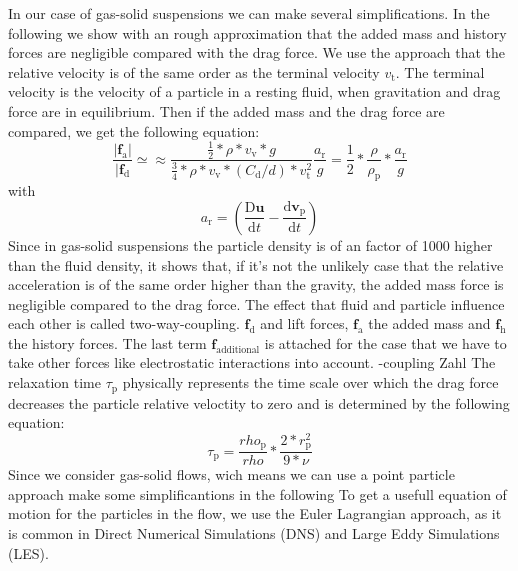 \documentclass[a4paper,12pt]{article}
\renewcommand*\vec[1]{\boldsymbol{#1}}
\numberwithin{equation}{section} %
\begin{document}
In our case of gas-solid suspensions we can make several simplifications.
In the following we show with an rough approximation that the added mass and history forces are negligible compared with the drag force.
We use the approach that the relative velocity is of the same order as the terminal velocity $v_\mathrm{t}$. The terminal velocity is the velocity of a particle in a resting fluid, when gravitation and drag force are in equilibrium. Then if the added mass and the drag force are compared, we get the following equation:
\begin{equation}
\frac{|\vec{f_\mathrm{a}}|}{|\vec{f_\mathrm{d}}} \simeq \approx \frac{\frac{1}{2}*\rho*v_\mathrm{v}*g}{\frac{3}{4}*\rho*v_\mathrm{v}*(C_\mathrm{d}/d)*v_\mathrm{t}^\mathrm{2}}\frac{a_\mathrm{r}}{g} = \frac{1}{2}*\frac{\rho}{\rho_\mathrm{p}}*\frac{a_\mathrm{r}}{g}
\end{equation}
with 
\begin{equation}
a_\mathrm{r}=(\frac{\mathrm{D}\vec{u}}{\mathrm{d}t}-\frac{\mathrm{d}\vec{v_\mathrm{p}}}{\mathrm{d}t})
\end{equation}
Since in gas-solid suspensions the particle density is of an factor of 1000 higher than the fluid density, it shows that, if it's not the unlikely case that the relative acceleration is of the same order higher than the gravity, the added mass force is negligible compared to the drag force.
The effect that fluid and particle influence each other is called two-way-coupling.
$\vec{f_\mathrm{d}}$ and lift forces, $\vec{f_\mathrm{a}}$  the added mass and $\vec{f_\mathrm{h}}$ the history forces. The last term $\vec{f_\mathrm{additional}}$ is attached for the case that we have to take other forces like electrostatic interactions into account.
\newline
-coupling Zahl
\newline
The relaxation time $\tau_\mathrm{p}$ physically represents the time scale over which the drag force decreases the particle relative veloctity to zero and is determined by the following equation:
\begin{equation}
\tau_\mathrm{p} = \frac{rho_\mathrm{p}}{rho}*\frac{2*r_\mathrm{p}^\mathrm{2}}{9*\nu}
\end{equation}
Since we consider gas-solid flows, wich means  we can use a point particle approach  make some simplificantions in the following 
To get a usefull equation of motion for the particles in the flow, we use the Euler Lagrangian approach, as it is common in Direct Numerical Simulations (DNS) and Large Eddy Simulations (LES).
\end{document}

